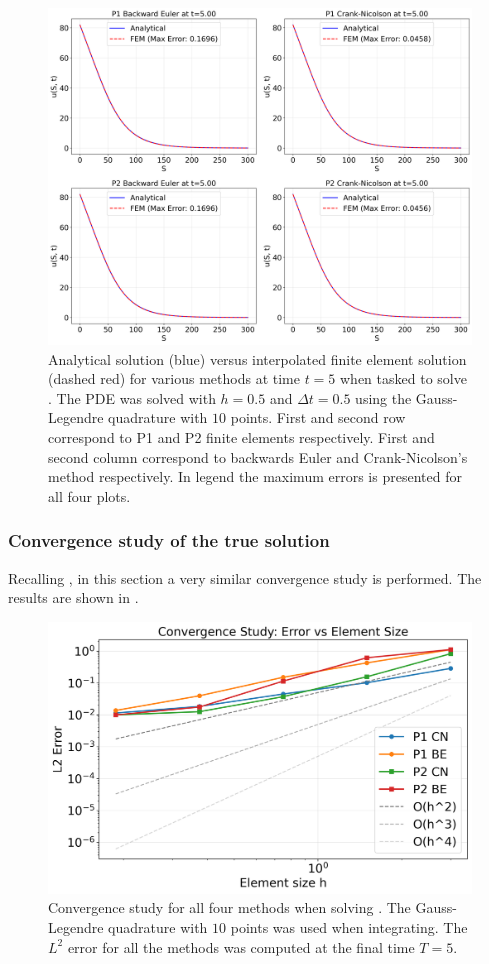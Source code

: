 \documentclass{article}
\begin{document}
\begin{figure}[!ht]
    \centering
    \includegraphics[width=0.92\linewidth]{code/images/fem_vs_analytical_BlackScholesTrue.png}
    \caption{Analytical solution (blue) versus interpolated finite element solution (dashed red) for various methods at time $t=5$ when tasked to solve . The PDE was solved with $h =0.5$ and $\Delta t = 0.5$ using the Gauss-Legendre quadrature with $10$ points. First and second row correspond to P1 and P2 finite elements respectively. First and second column correspond to backwards Euler and Crank-Nicolson's method respectively. In legend the maximum errors is presented for all four plots.}
    \label{fig:fem_vs_true_true}
\end{figure}

\subsubsection{Convergence study of the true solution}
Recalling , in this section a very similar convergence study is performed. The results are shown in . 
\begin{figure}[!ht]
    \centering
    \includegraphics[width=0.7\linewidth]{code/images/convergence_study_BlackScholesTrue.png}
    \caption{Convergence study for all four methods when solving . The Gauss-Legendre quadrature with $10$ points was used when integrating. The $L^2$ error for all the methods was computed at the final time $T=5$.}
    \label{fig:conv_true}
\end{figure}
\end{document}
